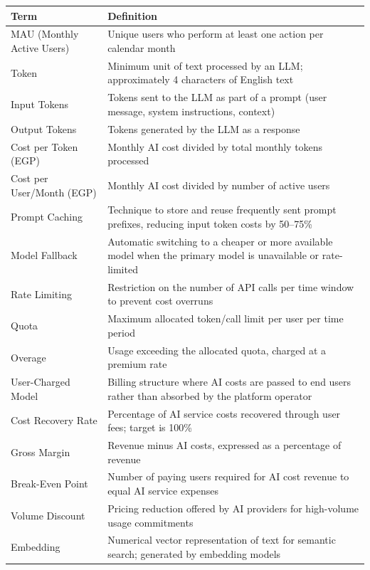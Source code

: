 \documentclass[11pt,a4paper]{article}
\begin{document}
\begin{table}[H]
\centering
\footnotesize
\begin{tabular}{|p{3.5cm}|p{9.5cm}|}
\hline
\textbf{Term} & \textbf{Definition} \\
\hline
MAU (Monthly Active Users) & Unique users who perform at least one action per calendar month \\
\hline
Token & Minimum unit of text processed by an LLM; approximately 4 characters of English text \\
\hline
Input Tokens & Tokens sent to the LLM as part of a prompt (user message, system instructions, context) \\
\hline
Output Tokens & Tokens generated by the LLM as a response \\
\hline
Cost per Token (EGP) & Monthly AI cost divided by total monthly tokens processed \\
\hline
Cost per User/Month (EGP) & Monthly AI cost divided by number of active users \\
\hline
Prompt Caching & Technique to store and reuse frequently sent prompt prefixes, reducing input token costs by 50--75\% \\
\hline
Model Fallback & Automatic switching to a cheaper or more available model when the primary model is unavailable or rate-limited \\
\hline
Rate Limiting & Restriction on the number of API calls per time window to prevent cost overruns \\
\hline
Quota & Maximum allocated token/call limit per user per time period \\
\hline
Overage & Usage exceeding the allocated quota, charged at a premium rate \\
\hline
User-Charged Model & Billing structure where AI costs are passed to end users rather than absorbed by the platform operator \\
\hline
Cost Recovery Rate & Percentage of AI service costs recovered through user fees; target is 100\% \\
\hline
Gross Margin & Revenue minus AI costs, expressed as a percentage of revenue \\
\hline
Break-Even Point & Number of paying users required for AI cost revenue to equal AI service expenses \\
\hline
Volume Discount & Pricing reduction offered by AI providers for high-volume usage commitments \\
\hline
Embedding & Numerical vector representation of text for semantic search; generated by embedding models \\

\end{tabular}
\end{table}
\end{document}

